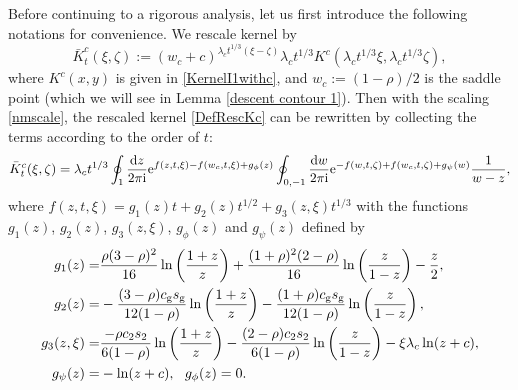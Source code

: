 \documentclass[cmp]{svjour}
\numberwithin{theorem}{section}
\numberwithin{equation}{section}
\def\ii{{\rm i}}
\begin{document}
Before continuing to a rigorous analysis, let us first introduce the following notations for convenience. We rescale kernel by 
\begin{equation}\label{DefRescKc}
	\bar{K}_t^{c} (\xi , \zeta) :=  {(w_c + c)}^{\lambda_c t^{1/3} (\xi - \zeta)} \lambda_c t^{1/3} K^c(\lambda_c t^{1/3} \xi , \lambda_c t^{1/3} \zeta) ,
\end{equation}
where $K^c(x,y)$ is given in \eqref{KernelI1withc}, and $w_c:=(1-\rho)/2$ is the saddle point (which we will see in Lemma \ref{descent contour 1}). Then with the scaling  \eqref{nmscale}, the rescaled kernel \eqref{DefRescKc} can be rewritten by collecting the terms according to the order of $t$:
\begin{equation}\label{RescKernelc}
	\bar{K}_t^{c}(\xi , \zeta)  = \lambda_c t^{1/3} \oint_{1} \frac{\mathrm{d} z}{2 \pi \ii} \mathrm{e}^{ f(z , t , \xi) - f(w_c , t , \xi) + g_{\phi}(z) } \oint_{0 , -1} \frac{\mathrm{d} w}{2 \pi \ii} \mathrm{e}^{ - f(w , t , \zeta) + f(w_c , t , \zeta) + g_{\psi}(w) }   \frac{1}{w-z},
\end{equation}
where $f(z , t , \xi)=g_1(z)t+g_2(z)t^{1/2}+g_3(z,\xi)t^{1/3}$ with the functions $g_1(z)$, $g_2(z)$, $g_3(z,\xi)$, $g_{\phi}(z)$ and $g_{\psi}(z)$ defined by
\begin{subequations}\label{gDefine}
	\begin{align}
		g_1(z)=&
		\frac{\rho(3-\rho)^2}{16}
		\ln\left(\frac{1+z}{z}\right)+
		\frac{(1+\rho)^2(2-\rho)}{16}
		\ln\left(\frac{z}{1-z}\right)-\frac{z}{2},
		\label{g1 def1}
		\\
		g_2(z)=&
		-\frac{(3-\rho)c_{\rm g} s_{\rm g}}{12(1-\rho)}
		\ln\left(\frac{1+z}{z}\right)
		-\frac{(1+\rho)c_{\rm g} s_{\rm g}}{12(1-\rho)}
		\ln\left(\frac{z}{1-z}\right),
		\label{g2 def1}
		\\
		g_3(z,\xi)=&
		\frac{-\rho c_2 s_2}{6(1-\rho)}
		\ln\left(\frac{1+z}{z}\right)
		-
		\frac{(2-\rho)c_2 s_2}{6(1-\rho)}
		\ln\left(\frac{z}{1-z}\right)
		-\xi\lambda_c\ln(z+c),
		\label{g3 def1} \\
		g_{\psi}(z)=&-\ln(z+c),\,\,\,\,
		g_{\phi}(z)=0.
	\end{align}
	\label{g def1}
\end{subequations}
\end{document}
